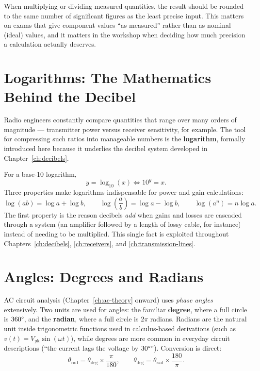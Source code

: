 When multiplying or dividing measured quantities, the result should be
rounded to the same number of significant figures as the least precise
input. This matters on exams that give component values ``as measured''
rather than as nominal (ideal) values, and it matters in the workshop when
deciding how much precision a calculation actually deserves.

\section{Logarithms: The Mathematics Behind the Decibel}

Radio engineers constantly compare quantities that range over many orders
of magnitude --- transmitter power versus receiver sensitivity, for
example. The tool for compressing such ratios into manageable numbers is
the \textbf{logarithm}, formally introduced here because it underlies the
decibel system developed in Chapter~\ref{ch:decibels}.

For a base-10 logarithm,
\[
y = \log_{10}(x) \iff 10^{y} = x .
\]
Three properties make logarithms indispensable for power and gain
calculations:
\[
\log(ab) = \log a + \log b, \qquad
\log\!\left(\frac{a}{b}\right) = \log a - \log b, \qquad
\log(a^n) = n\log a .
\]
The first property is the reason decibels \emph{add} when gains and losses
are cascaded through a system (an amplifier followed by a length of lossy
cable, for instance) instead of needing to be multiplied. This single fact
is exploited throughout Chapters~\ref{ch:decibels}, \ref{ch:receivers},
and \ref{ch:transmission-lines}.

\section{Angles: Degrees and Radians}

AC circuit analysis (Chapter~\ref{ch:ac-theory} onward) uses \emph{phase
angles} extensively. Two units are used for angles: the familiar
\textbf{degree}, where a full circle is $360\degree$, and the
\textbf{radian}, where a full circle is $2\pi$ radians. Radians are the
natural unit inside trigonometric functions used in calculus-based
derivations (such as $v(t) = V_{\text{pk}}\sin(\omega t)$), while degrees
are more common in everyday circuit descriptions (``the current lags the
voltage by $30\degree$''). Conversion is direct:
\[
\theta_{\text{rad}} = \theta_{\text{deg}} \times \frac{\pi}{180}, \qquad
\theta_{\text{deg}} = \theta_{\text{rad}} \times \frac{180}{\pi}.
\]

